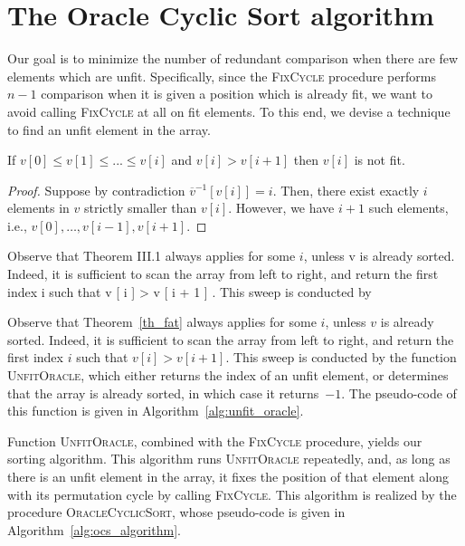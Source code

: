 

\section{The Oracle Cyclic Sort algorithm}

Our goal is to minimize the number of redundant comparison when there are few elements which are unfit.
Specifically, since the \textsc{FixCycle} procedure performs $n-1$ comparison
when it is given a position which is already fit,
we want to avoid calling \textsc{FixCycle} at all on fit elements.
To this end, we devise a technique to find an unfit element in the array.

\begin{thm}
\label{th_fat}
If $v[0] \le v[1] \le ... \le v[i]$ and $v[i] > v[i+1]$ then $v[i]$ is not fit.
\begin{proof}
Suppose by contradiction $\overline{v}^{-1}[v[i]] = i$.
Then, there exist exactly $i$ elements in $v$ strictly smaller than $v[i]$.
However, we have $i+1$ such elements, i.e., $v[0],\dots,v[i-1],v[i+1]$.
\end{proof}
\end{thm}

Observe that Theorem III.1 always
applies for some $i$, unless v is already sorted. Indeed,
it is sufficient to scan the array from left
to right, and return the first index i such
that v [ i ] > v [ i + 1 ] . This sweep is conducted by

Observe that Theorem~\ref{th_fat} always applies for some $i$, unless $v$ is already sorted.
Indeed, it is sufficient to scan the array from left to right,
and return the first index $i$ such that $v[i] > v[i+1]$.
This sweep is conducted by the function \textsc{UnfitOracle},
which either returns the index of an unfit element,
or determines that the array is already sorted,
in which case it returns~$-1$.
The pseudo-code of this function is given in Algorithm~\ref{alg:unfit_oracle}.



Function \textsc{UnfitOracle}, combined with the \textsc{FixCycle} procedure, yields our sorting algorithm.
This algorithm runs \textsc{UnfitOracle} repeatedly, and,
as long as there is an unfit element in the array,
it fixes the position of that element along with its permutation cycle
by calling \textsc{FixCycle}.
This algorithm is realized by the procedure \textsc{OracleCyclicSort},
whose pseudo-code is given in Algorithm~\ref{alg:ocs_algorithm}.


